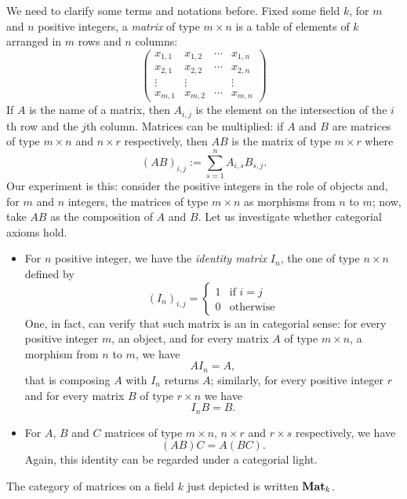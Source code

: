 \begin{example}[Matrices]
We need to clarify some terms and notations before. Fixed some field \(k\), for \(m\) and \(n\) positive integers, a {\em matrix} of type \(m \times n\) is a table of elements of \(k\) arranged in \(m\) rows and \(n\) columns:
\[\begin{pmatrix}
x_{1,1} & x_{1,2} & \cdots{} & x_{1,n} \\
x_{2,1} & x_{2,2} & \cdots{} & x_{2,n} \\
\vdots  & \vdots  &          & \vdots  \\
x_{m,1} & x_{m,2} & \cdots{} & x_{m,n}
\end{pmatrix}\]
If \(A\) is the name of a matrix, then \(A_{i, j}\) is the element on the intersection of the \(i\)th row and the \(j\)th column. Matrices can be multiplied: if \(A\) and \(B\) are matrices of type \(m \times n\) and \(n \times r\) respectively, then \(AB\) is the matrix of type \(m \times r\) where
\[(AB)_{i, j} := \sum_{s = 1}^n A_{i, s} B_{s ,j} .\]
Our experiment is this: consider the positive integers in the role of objects and, for \(m\) and \(n\) integers, the matrices of type \(m \times n\) as morphisms from \(n\) to \(m\); now, take \(AB\) as the composition of \(A\) and \(B\). Let us investigate whether categorial axioms hold.
\begin{itemize}
\item For \(n\) positive integer, we have the {\em identity matrix} \(I_n\), the one of type \(n \times n\) defined by
\[(I_n)_{i, j} = \begin{cases}
1 & \text{if } i = j \\
0 & \text{otherwise}
\end{cases}\]
One, in fact, can verify that such matrix is an  in categorial sense: for every positive integer \(m\), an object, and for every matrix \(A\) of type \(m \times n\), a morphism from \(n\) to \(m\), we have
\[A I_n = A ,\]
that is composing \(A\) with \(I_n\) returns \(A\); similarly, for every positive integer \(r\) and for every matrix \(B\) of type \(r \times n\) we have
\[I_n B = B .\]
\item For \(A\), \(B\) and \(C\) matrices of type \(m \times n\), \(n \times r\) and \(r \times s\) respectively, we have
\[(AB)C = A(BC) .\]
Again, this identity can be regarded under a categorial light.
\end{itemize}
The category of matrices on a field \(k\) just depicted is written \(\mathbf{Mat}_k\).
\end{example}

\begin{example}
\end{example}
